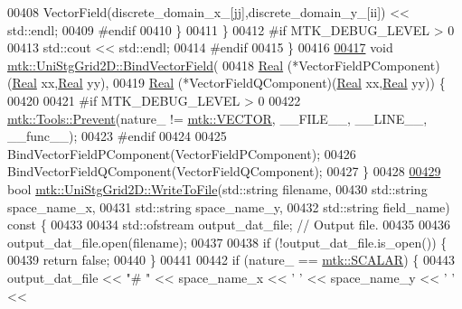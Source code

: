 \begin{DoxyCode}
00408         VectorField(discrete\_domain\_x\_[jj],discrete\_domain\_y\_[ii]) << std::endl;
00409 \textcolor{preprocessor}{      #endif}
00410     \}
00411   \}
00412 \textcolor{preprocessor}{  #if MTK\_DEBUG\_LEVEL > 0}
00413   std::cout << std::endl;
00414 \textcolor{preprocessor}{  #endif}
00415 \}
00416 
\hypertarget{mtk__uni__stg__grid__2d_8cc_source_l00417}{}\hyperlink{classmtk_1_1UniStgGrid2D_a1cba89c285973514c1351760d598c52b}{00417} \textcolor{keywordtype}{void} \hyperlink{classmtk_1_1UniStgGrid2D_a1cba89c285973514c1351760d598c52b}{mtk::UniStgGrid2D::BindVectorField}(
00418   \hyperlink{group__c01-roots_gac080bbbf5cbb5502c9f00405f894857d}{Real} (*VectorFieldPComponent)(\hyperlink{group__c01-roots_gac080bbbf5cbb5502c9f00405f894857d}{Real} xx,\hyperlink{group__c01-roots_gac080bbbf5cbb5502c9f00405f894857d}{Real} yy),
00419   \hyperlink{group__c01-roots_gac080bbbf5cbb5502c9f00405f894857d}{Real} (*VectorFieldQComponent)(\hyperlink{group__c01-roots_gac080bbbf5cbb5502c9f00405f894857d}{Real} xx,\hyperlink{group__c01-roots_gac080bbbf5cbb5502c9f00405f894857d}{Real} yy)) \{
00420 
00421 \textcolor{preprocessor}{  #if MTK\_DEBUG\_LEVEL > 0}
00422   \hyperlink{classmtk_1_1Tools_a332324c6f25e66be9dff48c5987a3b9f}{mtk::Tools::Prevent}(nature\_ != \hyperlink{namespacemtk_ga4c54f2a329cfb4e56213b02a259d19e2a3d8cb27a993651a74d67fb8c98ae91b2}{mtk::VECTOR}, \_\_FILE\_\_, \_\_LINE\_\_, \_\_func\_\_);
00423 \textcolor{preprocessor}{  #endif}
00424 
00425   BindVectorFieldPComponent(VectorFieldPComponent);
00426   BindVectorFieldQComponent(VectorFieldQComponent);
00427 \}
00428 
\hypertarget{mtk__uni__stg__grid__2d_8cc_source_l00429}{}\hyperlink{classmtk_1_1UniStgGrid2D_a1787a79e4bcee6b89c681dc7e5e2d7bc}{00429} \textcolor{keywordtype}{bool} \hyperlink{classmtk_1_1UniStgGrid2D_a1787a79e4bcee6b89c681dc7e5e2d7bc}{mtk::UniStgGrid2D::WriteToFile}(std::string filename,
00430                                     std::string space\_name\_x,
00431                                     std::string space\_name\_y,
00432                                     std::string field\_name)\textcolor{keyword}{ const }\{
00433 
00434   std::ofstream output\_dat\_file;  \textcolor{comment}{// Output file.}
00435 
00436   output\_dat\_file.open(filename);
00437 
00438   \textcolor{keywordflow}{if} (!output\_dat\_file.is\_open()) \{
00439     \textcolor{keywordflow}{return} \textcolor{keyword}{false};
00440   \}
00441 
00442   \textcolor{keywordflow}{if} (nature\_ == \hyperlink{namespacemtk_ga4c54f2a329cfb4e56213b02a259d19e2af481d45bd70d41381c7d72e200889205}{mtk::SCALAR}) \{
00443     output\_dat\_file << \textcolor{stringliteral}{"# "} << space\_name\_x <<  \textcolor{charliteral}{' '} << space\_name\_y << \textcolor{charliteral}{' '} <<

\end{DoxyCode}

